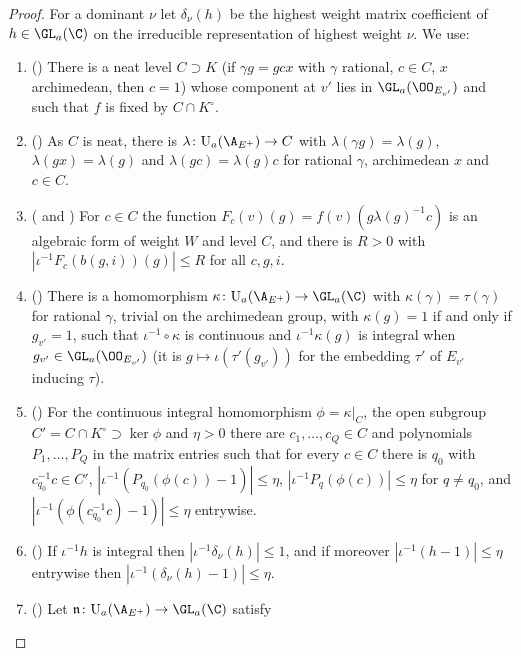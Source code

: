 \begin{proof}
For a dominant $\nu$ let $\delta_\nu(h)$ be the highest weight matrix coefficient of $h\in\GL_a(\C)$ on the irreducible
representation of highest weight $\nu$. We use:
\begin{enumerate}[label=(\alph*),nosep]
\item () There is a neat level $C\supset K$ (if $\gamma g=gcx$ with $\gamma$
  rational, $c\in C$, $x$ archimedean, then $c=1$) whose component at $v'$ lies in $\GL_a(\OO_{E_{v'}})$ and such that $f$ is
  fixed by $C\cap K^\circ$.
\item () As $C$ is neat, there is $\lambda\colon\galredU_a(\A_{E^+})\to C$ with
  $\lambda(\gamma g)=\lambda(g)$, $\lambda(gx)=\lambda(g)$ and $\lambda(gc)=\lambda(g)c$ for rational $\gamma$, archimedean
  $x$ and $c\in C$.
\item ( and ) For $c\in C$ the function
  $F_c(v)(g)=f(v)(g\lambda(g)^{-1}c)$ is an algebraic form of weight $W$ and level $C$, and there is $R>0$ with
  $|\iota^{-1}F_c(b(g,i))(g)|\le R$ for all $c,g,i$.
\item () There is a homomorphism
  $\kappa\colon\galredU_a(\A_{E^+})\to\GL_a(\C)$ with $\kappa(\gamma)=\tau(\gamma)$ for rational $\gamma$, trivial on the
  archimedean group, with $\kappa(g)=1$ if and only if $g_{v'}=1$, such that $\iota^{-1}\circ\kappa$ is continuous and
  $\iota^{-1}\kappa(g)$ is integral when $g_{v'}\in\GL_a(\OO_{E_{v'}})$ (it is $g\mapsto\iota(\tau'(g_{v'}))$ for the
  embedding $\tau'$ of $E_{v'}$ inducing $\tau$).
\item () For the continuous integral homomorphism $\phi=\kappa|_C$, the open
  subgroup $C'=C\cap K^\circ\supset\ker\phi$ and $\eta>0$ there are $c_1,\dots,c_Q\in C$ and polynomials $P_1,\dots,P_Q$ in
  the matrix entries such that for every $c\in C$ there is $q_0$ with $c_{q_0}^{-1}c\in C'$,
  $|\iota^{-1}(P_{q_0}(\phi(c))-1)|\le\eta$, $|\iota^{-1}P_q(\phi(c))|\le\eta$ for $q\ne q_0$, and
  $|\iota^{-1}(\phi(c_{q_0}^{-1}c)-1)|\le\eta$ entrywise.
\item () If $\iota^{-1}h$ is integral then $|\iota^{-1}\delta_\nu(h)|\le1$, and if
  moreover $|\iota^{-1}(h-1)|\le\eta$ entrywise then $|\iota^{-1}(\delta_\nu(h)-1)|\le\eta$.
\item () Let $\mathfrak n\colon\galredU_a(\A_{E^+})\to\GL_a(\C)$ satisfy

\end{enumerate}
\end{proof}
